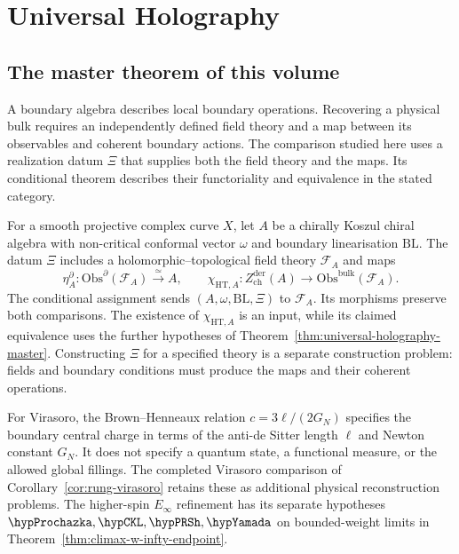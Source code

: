 \chapter{Universal Holography}
\label{ch:programme-climax-platonic}

\providecommand{\Phihol}{\Phi_{\mathrm{hol}}}
\providecommand{\HTQFTclimax}{\mathsf{HT\text{-}QFT}}
\providecommand{\ChirAlgclimax}{\mathsf{ChirAlg}}
\providecommand{\Vir}{\mathrm{Vir}}

\section{The master theorem of this volume}
\label{sec:climax-master-theorem}

A boundary algebra describes local boundary operations. Recovering a
physical bulk requires an independently defined field theory and a map
between its observables and coherent boundary actions. The comparison
studied here uses a realization datum $\Xi$ that supplies both the field
theory and the maps. Its conditional theorem describes their
functoriality and equivalence in the stated category.

For a smooth projective complex curve $X$, let $A$ be a chirally Koszul
chiral algebra with non-critical conformal vector $\omega$ and boundary
linearisation $\mathrm{BL}$. The datum $\Xi$ includes a
holomorphic--topological field theory $\mathcal F_A$ and maps
\[
 \eta_A^\partial\colon\mathrm{Obs}^{\partial}(\mathcal F_A)
      \xrightarrow{\simeq} A,
 \qquad
 \chi_{\mathrm{HT},A}\colon Z^{\mathrm{der}}_{\mathrm{ch}}(A)
      \longrightarrow\mathrm{Obs}^{\mathrm{bulk}}(\mathcal F_A).
\]
The conditional assignment sends $(A,\omega,\mathrm{BL},\Xi)$ to
$\mathcal F_A$. Its morphisms preserve both comparisons. The existence
of $\chi_{\mathrm{HT},A}$ is an input, while its claimed equivalence
uses the further hypotheses of Theorem~\ref{thm:universal-holography-master}.
Constructing $\Xi$ for a specified theory is a separate construction problem: fields and boundary conditions must produce the maps and
their coherent operations.

For Virasoro, the Brown--Henneaux relation $c=3\ell/(2G_N)$ specifies
the boundary central charge in terms of the anti-de Sitter length $\ell$
and Newton constant $G_N$. It does not specify a quantum state, a
functional measure, or the allowed global fillings. The completed
Virasoro comparison of Corollary~\ref{cor:rung-virasoro} retains these
as additional physical reconstruction problems. The higher-spin
$E_\infty$ refinement has its separate hypotheses
$\hypProchazka,\hypCKL,\hypPRSh,\hypYamada$ on bounded-weight
limits in Theorem~\ref{thm:climax-w-infty-endpoint}.

